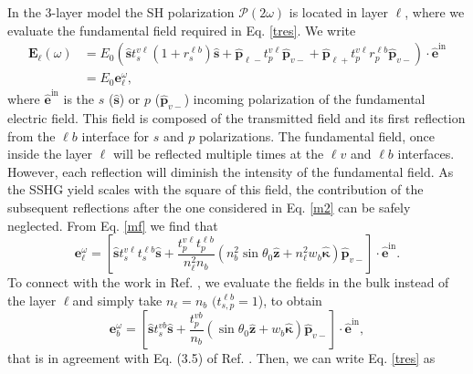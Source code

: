 In the 3-layer model the SH polarization $\boldsymbol{\mathcal{P}}(2\omega)$ is
located in layer $\ell$, where we evaluate the fundamental field required in Eq.
\eqref{tres}. We write
\begin{equation}\label{m2}
\begin{split}
\mathbf{E}_{\ell}(\omega) 
&= E_{0}
\left(
  \hat{\mathbf{s}} t^{v\ell}_{s}(1+r^{\ell b}_{s})\hat{\mathbf{s}}
+ \hat{\mathbf{p}}_{\ell-}t^{v\ell}_{p}\hat{\mathbf{p}}_{v-}
+ \hat{\mathbf{p}}_{\ell+}t^{v\ell}_{p}r^{\ell b}_{p}\hat{\mathbf{p}}_{v-}
\right)
\cdot\hat{\mathbf{e}}^{\mathrm{in}}\\
&= E_{0}\mathbf{e}^\omega_{\ell},
\end{split}
\end{equation} 
where $\hat{\mathbf{e}}^{\mathrm{in}}$ is the $s$ ($\hat{\mathbf{s}}$) or $p$
($\hat{\mathbf{p}}_{v-}$) incoming polarization of the fundamental electric
field. This field is composed of the transmitted field and its first reflection
from the $\ell b$ interface for $s$ and $p$ polarizations. The fundamental
field, once inside the layer $\ell$ will be reflected multiple times at the
$\ell v$ and $\ell b$ interfaces. However, each reflection will diminish the
intensity of the fundamental field. As the SSHG yield scales with the square of
this field, the contribution of the subsequent reflections after the one
considered in Eq. \eqref{m2} can be safely neglected. From Eq. \eqref{mf} we
find that
\begin{equation}\label{m12}
\mathbf{e}^{\omega}_{\ell} =
\left[
  \hat{\mathbf{s}}t_{s}^{v\ell}t_{s}^{\ell b}\hat{\mathbf{s}} 
+ \frac{t^{v\ell}_{p}t^{\ell b}_{p}}{n^{2}_{\ell} n_{b}}
\left(
  n^{2}_{b}\sin\theta_{0}\hat{\mathbf{z}} 
+ n^{2}_{\ell} w_b\hat{\boldsymbol{\kappa}}
\right)
\hat{\mathbf{p}}_{v-}
\right]
\cdot\hat{\mathbf{e}}^{\mathrm{in}}.  
\end{equation}  
To connect with the work in Ref. \cite{mizrahiJOSA88}, we evaluate the fields in
the bulk instead of the layer $\ell$and simply take $n_{\ell} = n_{b}$
$(t^{\ell b}_{s,p} = 1$), to obtain
\begin{equation}\label{m13}
\mathbf{e}^{\omega}_{b} =
\left[
  \hat{\mathbf{s}}t_{s}^{vb}\hat{\mathbf{s}}
+ \frac{t^{vb}_{p}}{n_{b}}
\left(\sin\theta_{0}\hat{\mathbf{z}} + w_b\hat{\boldsymbol{\kappa}}\right) 
\hat{\mathbf{p}}_{v-}
\right]
\cdot\hat{\mathbf{e}}^{\mathrm{in}},  
\end{equation} 
that is in agreement with Eq. (3.5) of Ref. \cite{mizrahiJOSA88}. Then, we can
write Eq. \eqref{tres} as
